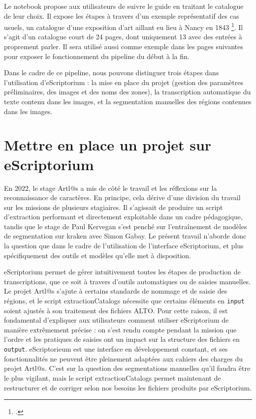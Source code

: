 \documentclass[a4paper,12pt,twoside]{book}
\begin{document}
Le notebook propose aux utilisateurs de suivre le guide en traitant le catalogue de leur choix. Il expose les étapes à travers d'un exemple représentatif des cas usuels, un catalogue d'une exposition d'art aillant eu lieu à Nancy en 1843 \footcite{societelorrainedesamisdesartsCataloguePeinturesMiniatures1843}. Il s'agit d'un catalogue court de 24 pages, dont uniquement 13 avec des entrées à proprement parler. Il sera utilisé aussi comme exemple dans les pages suivantes pour exposer le fonctionnement du pipeline du début à la fin.

Dans le cadre de ce pipeline, nous pouvons distinguer trois étapes dans l'utilisation d'eScriptorium : la mise en place du projet (gestion des paramètres préliminaires, des images et des noms des zones), la transcription automatique du texte contenu dans les images, et la segmentation manuelles des régions contenues dans les images.

\section{Mettre en place un projet sur eScriptorium}

En 2022, le stage Artl@s a mis de côté le travail et les réflexions sur la reconnaissance de caractères. En principe, cela dérive d'une division du travail sur les missions de plusieurs stagiaires. Il s'agissait de produire un script d'extraction performant et directement exploitable dans un cadre pédagogique, tandis que le stage de Paul Kervegan s'est penché sur l'entraînement de modèles de segmentation sur kraken avec Simon Gabay. Le présent travail n'aborde donc la question que dans le cadre de l'utilisation de l'interface eScriptorium, et plus spécifiquement des outils et modèles qu'elle met à disposition. 

eScriptorium permet de gérer intuitivement toutes les étapes de production de transcriptions, que ce soit à travers d'outils automatiques ou de saisies manuelles. Le projet Artl@s s'ajute à certains standards de nommage et de saisie des régions, et le script extractionCatalogs nécessite que certains éléments en \texttt{input} soient ajustés à son traitement des fichiers ALTO. Pour cette raison, il est fondamental d'expliquer aux utilisateurs comment utiliser eScriptorium de manière extrêmement précise : on s'est rendu compte  pendant la mission que l'ordre et les pratiques de saisies ont un impact sur la structure des fichiers en \texttt{output}. eScriptorieum est une interface en développement constant, et ses fonctionnalités ne peuvent être pleinement adaptées aux cahiers des charges du projet Artl@s. C'est sur la question des segmentations manuelles qu'il faudra être le plus vigilant, mais le script extractionCatalogs permet maintenant de restructurer et de corriger selon nos besoins les fichiers produits par eScriptorium. 
\end{document}
